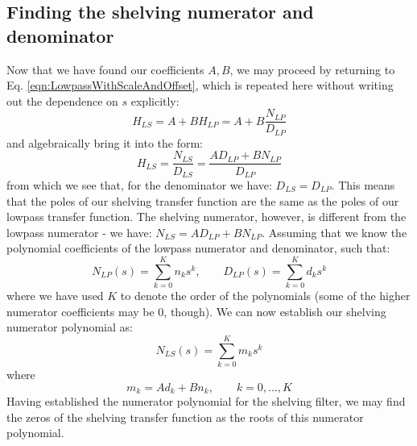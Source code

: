 \subsection{Finding the shelving numerator and denominator}
Now that we have found our coefficients $A, B$, we may proceed by returning to Eq. \ref{eqn:LowpassWithScaleAndOffset}, which is repeated here without writing out the dependence on $s$ explicitly:
\begin{equation}
 H_{LS} = A + B H_{LP} = A + B \frac{N_{LP}}{D_{LP}} 
\end{equation}
and algebraically bring it into the form:
\begin{equation}
 H_{LS} = \frac{N_{LS}}{D_{LS}} = \frac{A D_{LP} + B N_{LP}}{D_{LP}} 
\end{equation}
from which we see that, for the denominator we have: $D_{LS} = D_{LP}$. This means that the poles of our shelving transfer function are the same as the poles of our lowpass transfer function. The shelving numerator, however, is different from the lowpass numerator - we have: $N_{LS} = A D_{LP} + B N_{LP}$. Assuming that we know the polynomial coefficients of the lowpass numerator and denominator, such that:
\begin{equation}
 N_{LP}(s) = \sum_{k=0}^K n_k s^k, \qquad D_{LP}(s) = \sum_{k=0}^K d_k s^k
\end{equation}
where we have used $K$ to denote the order of the polynomials (some of the higher numerator coefficients may be $0$, though). We can now establish our shelving numerator polynomial as:
\begin{equation}
 N_{LS}(s) = \sum_{k=0}^K m_k s^k
\end{equation}
where
\begin{equation}
 m_k = A d_k + B n_k, \qquad k = 0, \ldots, K
\end{equation}
Having established the numerator polynomial for the shelving filter, we may find the zeros of the shelving transfer function as the roots of this numerator polynomial.



































